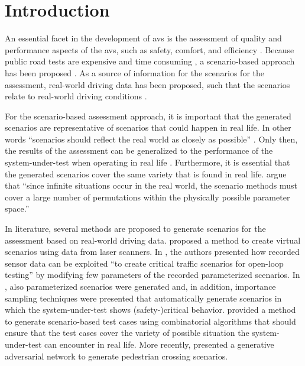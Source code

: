 \section{Introduction}
\label{sec:introduction}

An essential facet in the development of \acp{av} is the assessment of quality and performance aspects of the \acp{av}, such as safety, comfort, and efficiency \autocite{bengler2014threedecades, stellet2015taxonomy, koopman2016challenges}. 
Because public road tests are expensive and time consuming \autocite{kalra2016driving, zhao2018evaluation}, a scenario-based approach has been proposed \autocite{riedmaier2020survey, elrofai2018scenario, putz2017pegasus, krajewski2018highD, deGelder2017assessment, stellet2015taxonomy, jacobo2019development}.
As a source of information for the scenarios for the assessment, real-world driving data has been proposed, such that the scenarios relate to real-world driving conditions \autocite{elrofai2018scenario, putz2017pegasus, krajewski2018highD}.

For the scenario-based assessment approach, it is important that the generated scenarios are representative of scenarios that could happen in real life. 
In other words ``scenarios should reflect the real world as closely as possible'' \autocite{riedmaier2020survey}.
Only then, the results of the assessment can be generalized to the performance of the system-under-test when operating in real life \autocite{deGelder2017assessment}.
Furthermore, it is essential that the generated scenarios cover the same variety that is found in real life. 
\textcite{riedmaier2020survey} argue that ``since infinite situations occur in the real world, the scenario methods must cover a large number of permutations within the physically possible parameter space.''

In literature, several methods are proposed to generate scenarios for the assessment based on real-world driving data. 
\textcite{lages2013automatic} proposed a method to create virtual scenarios using data from laser scanners. 
In \autocite{zofka2015datadrivetrafficscenarios}, the authors presented how recorded sensor data can be exploited ``to create critical traffic scenarios for open-loop testing'' by modifying few parameters of the recorded parameterized scenarios. 
In \autocite{feng2020testing, deGelder2017assessment, thal2020incorporating}, also parameterized scenarios were generated and, in addition, importance sampling techniques were presented that automatically generate scenarios in which the system-under-test shows (safety-)critical behavior. 
\textcite{schuldt2018method} provided a method to generate scenario-based test cases using combinatorial algorithms that should ensure that the test cases cover the variety of possible situation the system-under-test can encounter in real life.
More recently, \autocite{spooner2021generation} presented a generative adversarial network to generate pedestrian crossing scenarios.

